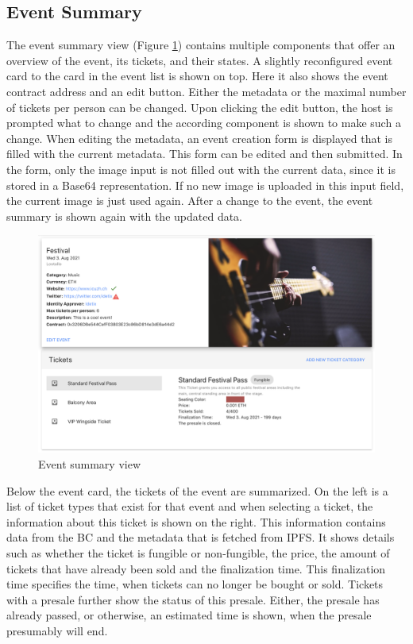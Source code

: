 \subsection{Event Summary}
The event summary view (Figure \ref{img:host-event-summary}) contains multiple components that offer an overview of the event, its tickets, and their states. A slightly reconfigured event card to the card in the event list is shown on top. Here it also shows the event contract address and an edit button. Either the metadata or the maximal number of tickets per person can be changed. Upon clicking the edit button, the host is prompted what to change and the according component is shown to make such a change.
When editing the metadata, an event creation form is displayed that is filled with the current metadata. This form can be edited and then submitted. In the form, only the image input is not filled out with the current data, since it is stored in a Base64 representation. If no new image is uploaded in this input field, the current image is just used again. After a change to the event, the event summary is shown again with the updated data.

\begin{figure}[H]
    \centering
    \includegraphics[width=14cm]{images/host-event-summary.png}
    \caption{Event summary view \protect}
    \label{img:host-event-summary}
\end{figure}

Below the event card, the tickets of the event are summarized. On the left is a list of ticket types that exist for that event and when selecting a ticket, the information about this ticket is shown on the right. This information contains data from the BC and the metadata that is fetched from IPFS. It shows details such as whether the ticket is fungible or non-fungible, the price, the amount of tickets that have already been sold and the finalization time. This finalization time specifies the time, when tickets can no longer be bought or sold.
Tickets with a presale further show the status of this presale. Either, the presale has already passed, or otherwise, an estimated time is shown, when the presale presumably will end.

